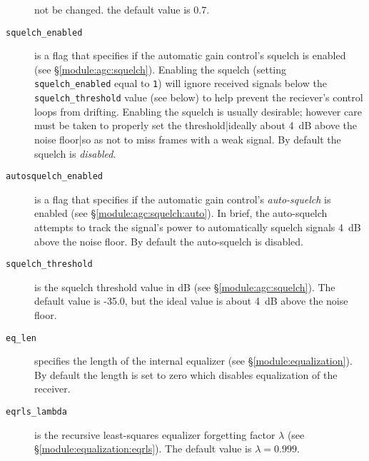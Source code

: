 \begin{description}
    not be changed.
    the default value is 0.7.
\item[{\tt squelch\_enabled}]
    is a flag that specifies if the automatic gain control's squelch is
    enabled (see \S\ref{module:agc:squelch}).
    Enabling the squelch
    (setting {\tt squelch\_enabled} equal to {\tt 1})
    will ignore received signals below the {\tt squelch\_threshold}
    value (see below) to help prevent the reciever's control loops from
    drifting.
    Enabling the squelch is usually desirable;
    however care must be taken to properly set the threshold|ideally
    about 4~dB above the noise floor|so as not to miss frames with a
    weak signal.
    By default the squelch is {\em disabled}.
\item[{\tt autosquelch\_enabled}]
    is a flag that specifies if the automatic gain control's
    {\em auto-squelch} is enabled (see
    \S\ref{module:agc:squelch:auto}).
    In brief, the auto-squelch attempts to track the signal's power to
    automatically squelch signals 4~dB above the noise floor.
    By default the auto-squelch is disabled.
\item[{\tt squelch\_threshold}]
    is the squelch threshold value in dB
    (see \S\ref{module:agc:squelch}).
    The default value is -35.0, but the ideal value is about 4~dB above
    the noise floor.
\item[{\tt eq\_len}]
    specifies the length of the internal equalizer
    (see \S\ref{module:equalization}).
    By default the length is set to zero which disables equalization of
    the receiver.
\item[{\tt eqrls\_lambda}]
    is the recursive least-squares equalizer forgetting factor
    $\lambda$
    (see \S\ref{module:equalization:eqrls}).
    The default value is $\lambda=0.999$.
\end{description}


